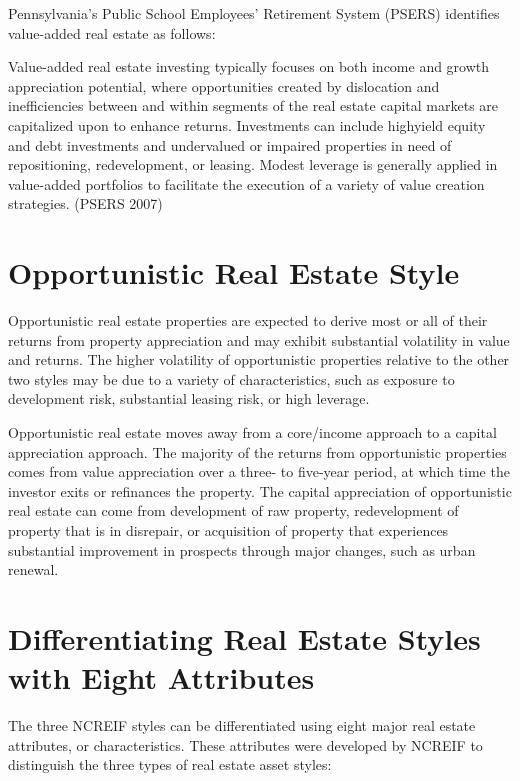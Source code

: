 \documentclass[11pt]{article}
\begin{document}
Pennsylvania's Public School Employees' Retirement System (PSERS) identifies value-added real estate as follows:

Value-added real estate investing typically focuses on both income and growth appreciation potential, where opportunities created by dislocation and inefficiencies between and within segments of the real estate capital markets are capitalized upon to enhance returns. Investments can include highyield equity and debt investments and undervalued or impaired properties in need of repositioning, redevelopment, or leasing. Modest leverage is generally applied in value-added portfolios to facilitate the execution of a variety of value creation strategies. (PSERS 2007)

\section*{Opportunistic Real Estate Style}
Opportunistic real estate properties are expected to derive most or all of their returns from property appreciation and may exhibit substantial volatility in value and returns. The higher volatility of opportunistic properties relative to the other two styles may be due to a variety of characteristics, such as exposure to development risk, substantial leasing risk, or high leverage.

Opportunistic real estate moves away from a core/income approach to a capital appreciation approach. The majority of the returns from opportunistic properties comes from value appreciation over a three- to five-year period, at which time the investor exits or refinances the property. The capital appreciation of opportunistic real estate can come from development of raw property, redevelopment of property that is in disrepair, or acquisition of property that experiences substantial improvement in prospects through major changes, such as urban renewal.

\section*{Differentiating Real Estate Styles with Eight Attributes}
The three NCREIF styles can be differentiated using eight major real estate attributes, or characteristics. These attributes were developed by NCREIF to distinguish the three types of real estate asset styles:
\end{document}
